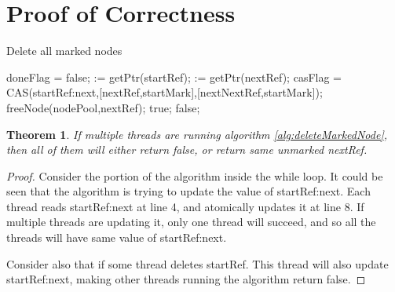 \documentclass[11pt,onecolumn]{IEEEtran}
\newtheorem {theorem}{Theorem}
\begin{document}
\section{Proof of Correctness}
\begin{algorithm}
  \caption{Delete all marked nodes}
  \label{alg:deleteMarkedNode}
  \begin{algorithmic}[5]
      \State doneFlag = false;
         := getPtr(startRef);
           := getPtr(nextRef);
            \State casFlag = CAS(startRef:next,[nextRef,startMark],[nextNextRef,startMark]);
               \State freeNode(nodePool,nextRef);
            \EndIf
          \Else
            \State
            \Return true;
          \EndIf
        \Else{}
          \State
          \Return false;  
        \EndIf
      \EndWhile        
    \EndFunction
  \end{algorithmic}
\end{algorithm}

\begin{theorem}
  If multiple threads are running algorithm \ref{alg:deleteMarkedNode}, then all of them will either return false, or return same unmarked nextRef.
\end{theorem}
\begin{proof}
  Consider the portion of the algorithm inside the while loop. It could be seen that the algorithm is trying to update the value of startRef:next. Each thread reads startRef:next at line 4, and atomically updates it at line 8. If multiple threads are updating it, only one thread will succeed, and so all the threads will have same value of startRef:next.

  Consider also that if some thread deletes startRef. This thread will also update startRef:next, making other threads running the algorithm return false.
\end{proof}
\end{document}
